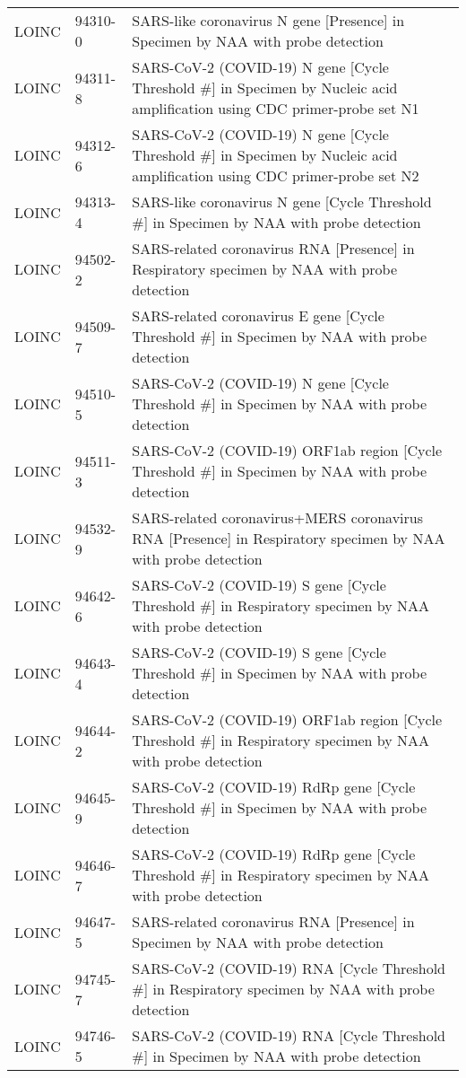 \begin{table}[ht]
\begin{tabular}{lll}
  LOINC & 94310-0 & SARS-like coronavirus N gene [Presence] in Specimen by NAA with probe detection \\ 
  LOINC & 94311-8 & SARS-CoV-2 (COVID-19) N gene [Cycle Threshold \#] in Specimen by Nucleic acid amplification using CDC primer-probe set N1 \\ 
  LOINC & 94312-6 & SARS-CoV-2 (COVID-19) N gene [Cycle Threshold \#] in Specimen by Nucleic acid amplification using CDC primer-probe set N2 \\ 
  LOINC & 94313-4 & SARS-like coronavirus N gene [Cycle Threshold \#] in Specimen by NAA with probe detection \\ 
  LOINC & 94502-2 & SARS-related coronavirus RNA [Presence] in Respiratory specimen by NAA with probe detection \\ 
  LOINC & 94509-7 & SARS-related coronavirus E gene [Cycle Threshold \#] in Specimen by NAA with probe detection \\ 
  LOINC & 94510-5 & SARS-CoV-2 (COVID-19) N gene [Cycle Threshold \#] in Specimen by NAA with probe detection \\ 
  LOINC & 94511-3 & SARS-CoV-2 (COVID-19) ORF1ab region [Cycle Threshold \#] in Specimen by NAA with probe detection \\ 
  LOINC & 94532-9 & SARS-related coronavirus+MERS coronavirus RNA [Presence] in Respiratory specimen by NAA with probe detection \\ 
  LOINC & 94642-6 & SARS-CoV-2 (COVID-19) S gene [Cycle Threshold \#] in Respiratory specimen by NAA with probe detection \\ 
  LOINC & 94643-4 & SARS-CoV-2 (COVID-19) S gene [Cycle Threshold \#] in Specimen by NAA with probe detection \\ 
  LOINC & 94644-2 & SARS-CoV-2 (COVID-19) ORF1ab region [Cycle Threshold \#] in Respiratory specimen by NAA with probe detection \\ 
  LOINC & 94645-9 & SARS-CoV-2 (COVID-19) RdRp gene [Cycle Threshold \#] in Specimen by NAA with probe detection \\ 
  LOINC & 94646-7 & SARS-CoV-2 (COVID-19) RdRp gene [Cycle Threshold \#] in Respiratory specimen by NAA with probe detection \\ 
  LOINC & 94647-5 & SARS-related coronavirus RNA [Presence] in Specimen by NAA with probe detection \\ 
  LOINC & 94745-7 & SARS-CoV-2 (COVID-19) RNA [Cycle Threshold \#] in Respiratory specimen by NAA with probe detection \\ 
  LOINC & 94746-5 & SARS-CoV-2 (COVID-19) RNA [Cycle Threshold \#] in Specimen by NAA with probe detection \\ 

\end{tabular}
\end{table}
